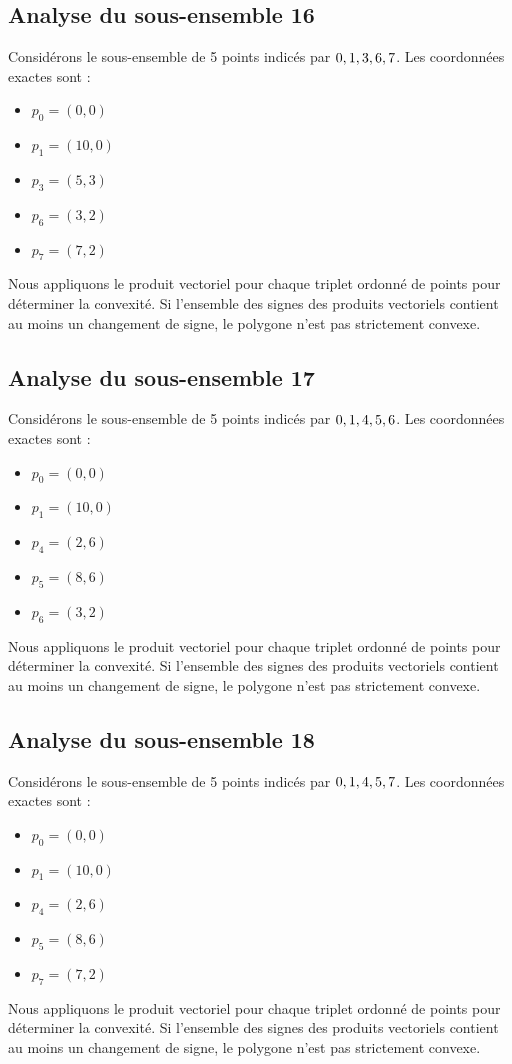\documentclass[11pt]{article}
\begin{document}
\subsection{Analyse du sous-ensemble 16}
Considérons le sous-ensemble de 5 points indicés par $\\{ 0, 1, 3, 6, 7 \\}$.
Les coordonnées exactes sont :
\begin{itemize}
\item $p_0 = (0, 0)$
\item $p_1 = (10, 0)$
\item $p_3 = (5, 3)$
\item $p_6 = (3, 2)$
\item $p_7 = (7, 2)$
\end{itemize}
Nous appliquons le produit vectoriel pour chaque triplet ordonné de points pour déterminer la convexité. Si l'ensemble des signes des produits vectoriels contient au moins un changement de signe, le polygone n'est pas strictement convexe.
\newpage

\subsection{Analyse du sous-ensemble 17}
Considérons le sous-ensemble de 5 points indicés par $\\{ 0, 1, 4, 5, 6 \\}$.
Les coordonnées exactes sont :
\begin{itemize}
\item $p_0 = (0, 0)$
\item $p_1 = (10, 0)$
\item $p_4 = (2, 6)$
\item $p_5 = (8, 6)$
\item $p_6 = (3, 2)$
\end{itemize}
Nous appliquons le produit vectoriel pour chaque triplet ordonné de points pour déterminer la convexité. Si l'ensemble des signes des produits vectoriels contient au moins un changement de signe, le polygone n'est pas strictement convexe.
\newpage

\subsection{Analyse du sous-ensemble 18}
Considérons le sous-ensemble de 5 points indicés par $\\{ 0, 1, 4, 5, 7 \\}$.
Les coordonnées exactes sont :
\begin{itemize}
\item $p_0 = (0, 0)$
\item $p_1 = (10, 0)$
\item $p_4 = (2, 6)$
\item $p_5 = (8, 6)$
\item $p_7 = (7, 2)$
\end{itemize}
Nous appliquons le produit vectoriel pour chaque triplet ordonné de points pour déterminer la convexité. Si l'ensemble des signes des produits vectoriels contient au moins un changement de signe, le polygone n'est pas strictement convexe.
\newpage
\end{document}
